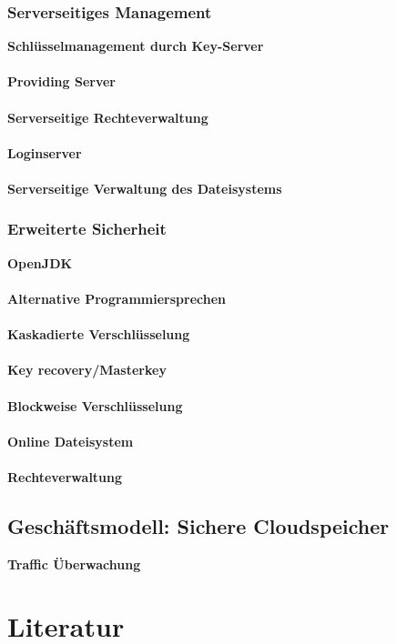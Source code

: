 \documentclass[12pt,a4paper,bibliography=totocnumbered,listof=totocnumbered]{scrartcl}
\begin{document}
\subsubsection{Serverseitiges Management}
\textbf{Schlüsselmanagement durch Key-Server}\\
\\\textbf{Providing Server}\\
\\\textbf{Serverseitige Rechteverwaltung}\\
\\\textbf{Loginserver}\\
\\\textbf{Serverseitige Verwaltung des Dateisystems}\\

\subsubsection{Erweiterte Sicherheit}
\textbf{OpenJDK}\\
\\\textbf{Alternative Programmiersprechen}\\
\\\textbf{Kaskadierte Verschlüsselung}\\
\\\textbf{Key recovery/Masterkey}\\
\\\textbf{Blockweise Verschlüsselung}\\
\\\textbf{Online Dateisystem}\\
\\\textbf{Rechteverwaltung}\\

\subsection{Geschäftsmodell: Sichere Cloudspeicher}
\textbf{Traffic Überwachung}\\

\pagebreak

\section{Literatur}

\pagebreak

\setcounter{page}{1}
\end{document}
